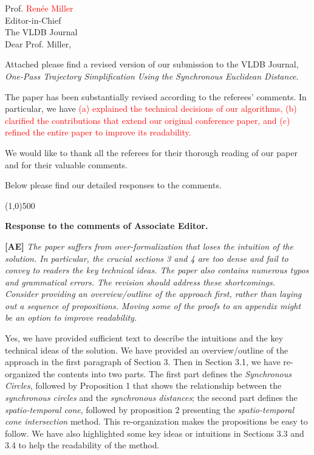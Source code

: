 \documentclass{letter}
\newcommand{\marked}[1]{\textcolor{red}{#1}}
\begin{document}
Prof. \marked{Renée Miller} \\
Editor-in-Chief		\\
The VLDB Journal	\\



Dear Prof. Miller,

Attached please find a revised version of our submission to
the VLDB Journal, \emph{One-Pass Trajectory Simplification Using the Synchronous Euclidean Distance}.


The paper has been substantially revised according to the referees' comments. In particular, we have \marked{ (a) explained the technical decisions of our algorithms, (b) clarified the contributions that extend our original conference paper, and (c) refined the entire paper to improve its readability.}

We would like to thank all the referees for their thorough reading of our paper and for their valuable comments.

Below please find our detailed responses to the comments.


\line(1,0){500}

\textbf{Response to the comments of Associate Editor.}

\textbf{[AE]} \emph{The paper suffers from over-formalization that loses the intuition of the solution. In particular, the crucial sections 3 and 4 are too dense and fail to convey to readers the key technical ideas. The paper also contains numerous typos and grammatical errors. The revision should address these shortcomings. Consider providing an overview/outline of the approach first, rather than laying out a sequence of propositions. Moving some of the proofs to an appendix might be an option to improve readability. }

Yes, we have provided sufficient text to describe the intuitions and the key technical ideas of the solution. We have provided an overview/outline of the approach in the first paragraph of Section 3. Then in Section 3.1, we have re-organized the contents into two parts. The first part defines the \emph{Synchronous Circles}, followed by Proposition 1 that shows the relationship between the \textit{synchronous circles} and the \textit{synchronous distances}; the second part defines the \textit{spatio-temporal cone}, followed by proposition 2 presenting the \textit{spatio-temporal cone intersection} method. This re-organization makes the propositions be easy to follow. We have also highlighted some key ideas or intuitions in Sections 3.3 and 3.4 to help the readability of the method.
\end{document}
